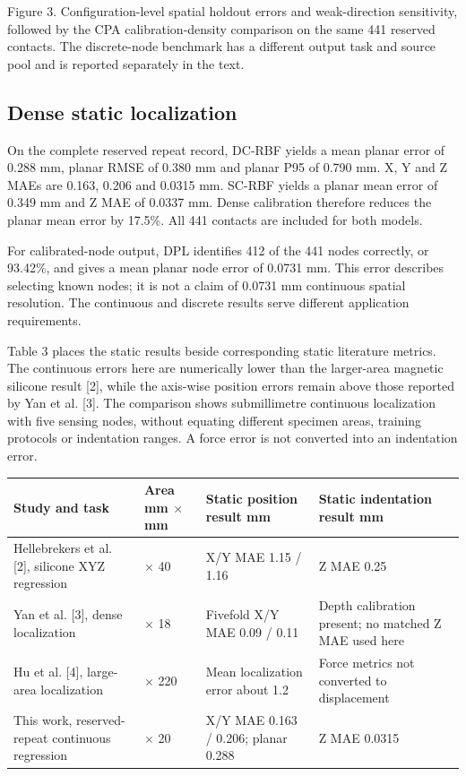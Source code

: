 \documentclass[preprint,12pt]{elsarticle}
\begin{document}
Figure 3. Configuration-level spatial holdout errors and weak-direction sensitivity, followed by the CPA calibration-density comparison on the same 441 reserved contacts. The discrete-node benchmark has a different output task and source pool and is reported separately in the text.

\subsection{Dense static localization}

On the complete reserved repeat record, DC-RBF yields a mean planar error of 0.288 mm, planar RMSE of 0.380 mm and planar P95 of 0.790 mm. X, Y and Z MAEs are 0.163, 0.206 and 0.0315 mm. SC-RBF yields a planar mean error of 0.349 mm and Z MAE of 0.0337 mm. Dense calibration therefore reduces the planar mean error by 17.5\%. All 441 contacts are included for both models.

For calibrated-node output, DPL identifies 412 of the 441 nodes correctly, or 93.42\%, and gives a mean planar node error of 0.0731 mm. This error describes selecting known nodes; it is not a claim of 0.0731 mm continuous spatial resolution. The continuous and discrete results serve different application requirements.

Table 3 places the static results beside corresponding static literature metrics. The continuous errors here are numerically lower than the larger-area magnetic silicone result [2], while the axis-wise position errors remain above those reported by Yan et al. [3]. The comparison shows submillimetre continuous localization with five sensing nodes, without equating different specimen areas, training protocols or indentation ranges. A force error is not converted into an indentation error.

\begin{center}\small
\begin{tabularx}{\linewidth}{>{\raggedright\arraybackslash}X>{\raggedright\arraybackslash}X>{\raggedright\arraybackslash}X>{\raggedright\arraybackslash}X}
\toprule
Study and task & Area mm \ensuremath{\times} mm & Static position result mm & Static indentation result mm \\
\midrule
Hellebrekers et al. [2], silicone XYZ regression & 40 \ensuremath{\times} 40 & X/Y MAE 1.15 / 1.16 & Z MAE 0.25 \\
Yan et al. [3], dense localization & 18 \ensuremath{\times} 18 & Fivefold X/Y MAE 0.09 / 0.11 & Depth calibration present; no matched Z MAE used here \\
Hu et al. [4], large-area localization & 220 \ensuremath{\times} 220 & Mean localization error about 1.2 & Force metrics not converted to displacement \\
This work, reserved-repeat continuous regression & 20 \ensuremath{\times} 20 & X/Y MAE 0.163 / 0.206; planar 0.288 & Z MAE 0.0315 \\
\bottomrule
\end{tabularx}\end{center}
\end{document}
